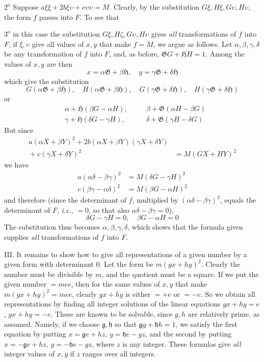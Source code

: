$2^{\mathrm{o}}$ Suppose $a\xi\xi+2b\xi\upsilon+c\upsilon\upsilon=M$. Clearly, by the substitution $G\xi,H\xi,G\upsilon,H\upsilon$, the form $f$ passes into $F$. To see that

$3^{\mathrm{o}}$ in this case the substitution $G\xi,H\zeta,G\upsilon,H\upsilon$ gives \textit{all} transformations of $f$ into $F$, if $\xi,\upsilon$ give all values of $x,y$ that make $f=M$, we argue as follows. Let $\alpha,\beta,\gamma,\delta$ be any transformation of $f$ into $F$, and, as before, $\mathfrak{G}G+\mathfrak{H}H=1$. Among the values of $x,y$ are then
\[
x=\alpha\mathfrak{G}+\beta\mathfrak{H},\quad y=\gamma\mathfrak{G}+\delta\mathfrak{H}
\]
which give the substitution
\[
G(\alpha\mathfrak{G}+\beta\mathfrak{H}),\quad H(\alpha\mathfrak{G}+\beta\mathfrak{H}),\quad G(\gamma\mathfrak{G}+\delta\mathfrak{H}),\quad H(\gamma\mathfrak{G}+\delta\mathfrak{H})
\]
or
\[
\begin{aligned}
&\alpha+\mathfrak{H}(\beta G-\alpha H), &\quad&\beta+\mathfrak{G}(\alpha H-\beta G)\\
&\gamma+\mathfrak{H}(\delta G-\gamma H), &&\delta+\mathfrak{G}(\gamma H-\delta G)
\end{aligned}
\]
But since
\[
\begin{aligned}a(\alpha X+\beta Y)^2+2b(\alpha X+\beta Y)(\gamma X+\delta Y)&{}\\
{}+c(\gamma X+\delta Y)^2&=M(GX+HY)^2\end{aligned}
\]
we have
\[
\begin{aligned}
a(\alpha\delta-\beta\gamma)^2&=M(\delta G-\gamma H)^2\\
c(\beta\gamma-\alpha\delta)^2&=M(\beta G-\alpha H)^2
\end{aligned}
\]
and therefore (since the determinant of $f$, multiplied by $(\alpha\delta-\beta\gamma)^2$, equals the determinant of $F$, \textit{i.e.}, $=0$, so that also $\alpha\delta-\beta\gamma=0$),
\[
\delta G-\gamma H=0,\quad \beta G-\alpha H=0
\]
The substitution thus becomes $\alpha,\beta,\gamma,\delta$, which shows that the formula given supplies \textit{all} transformations of $f$ into $F$.

III. It remains to show how to give all representations of a given number by a given form with determinant 0. Let the form be $m(gx+hy)^2$. Clearly the number must be divisible by $m$, and the quotient must be a square. If we put the given number $=mee$, then for the same values of $x,y$ that make $m(gx+hy)^2=mee$, clearly $gx+hy$ is either $=+e$ or $=-e$. So we obtain all representations by finding all integer solutions of the linear equations $gx+hy=e$, $gx+hy=-e$. These are known to be solvable, since $g,h$ are relatively prime, as assumed. Namely, if we choose $\mathfrak{g},\mathfrak{h}$ so that $\mathfrak{g}g+\mathfrak{h}h=1$, we satisfy the first equation by putting $x=\mathfrak{g}e+hz$, $y=\mathfrak{h}e-gz$, and the second by putting $x=-\mathfrak{g}e+hz$, $y=-\mathfrak{h}e-gz$, where $z$ is any integer. These formulas give \textit{all} integer values of $x,y$ if $z$ ranges over all integers.

